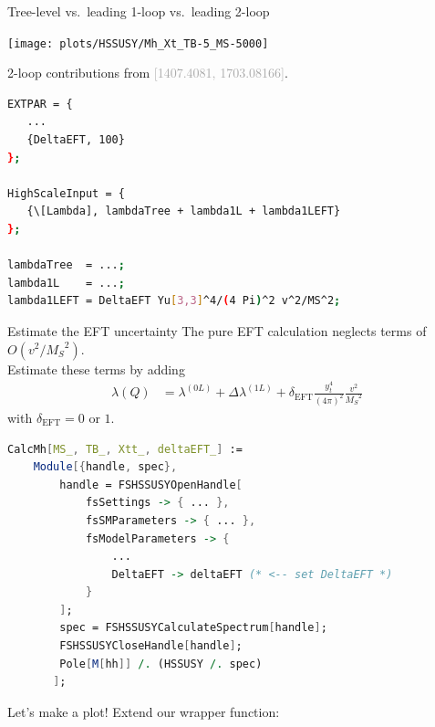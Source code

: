 \documentclass[hyperref={pdfpagelabels=false},ngerman]{beamer}
\newcommand{\MS}{\ensuremath{M_S}}
\newcommand{\bigcite}[1]{\textcolor{darkgray}{[#1]}}
\begin{document}
\begin{frame}{Tree-level vs.\ leading 1-loop vs.\ leading 2-loop}
  \begin{center}
    \texttt{[image: plots/HSSUSY/Mh\_Xt\_TB-5\_MS-5000]}
  \end{center}
  2-loop contributions from \bigcite{1407.4081, 1703.08166}.
\end{frame}

\begin{lrbox}{\listbox}\begin{lstlisting}[language=bash]
EXTPAR = {
   ...
   {DeltaEFT, 100}
};

HighScaleInput = {
   {\[Lambda], lambdaTree + lambda1L + lambda1LEFT}
};

lambdaTree  = ...;
lambda1L    = ...;
lambda1LEFT = DeltaEFT Yu[3,3]^4/(4 Pi)^2 v^2/MS^2;
\end{lstlisting}\end{lrbox} %

\begin{frame}{Estimate the EFT uncertainty}
  The pure EFT calculation neglects terms of $O(v^2/\MS^2)$.\\
  Estimate these terms by adding
  \begin{align*}
    \lambda(Q) &= \lambda^{(0L)} + \Delta\lambda^{(1L)}
    + \delta_\text{EFT} \frac{y_t^4}{(4\pi)^2} \frac{v^2}{\MS^2}
  \end{align*}
  with $\delta_\text{EFT} = 0$ or $1$.\\[1em]
  \usebox{\listbox}
\end{frame}

\begin{lrbox}{\listbox}\begin{lstlisting}[language=Mathematica]
CalcMh[MS_, TB_, Xtt_, deltaEFT_] :=
    Module[{handle, spec},
        handle = FSHSSUSYOpenHandle[
            fsSettings -> { ... },
            fsSMParameters -> { ... },
            fsModelParameters -> {
                ...
                DeltaEFT -> deltaEFT (* <-- set DeltaEFT *)
            }
        ];
        spec = FSHSSUSYCalculateSpectrum[handle];
        FSHSSUSYCloseHandle[handle];
        Pole[M[hh]] /. (HSSUSY /. spec)
       ];
\end{lstlisting}\end{lrbox} %

\begin{frame}{Let's make a plot!}
  Extend our wrapper function:\\[2em]
  \usebox{\listbox}
\end{frame}
\end{document}
